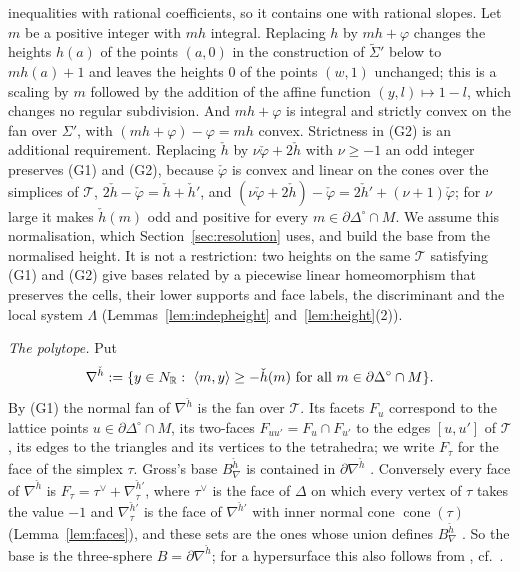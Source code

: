 inequalities with rational coefficients, so it contains one with rational slopes. Let $m$ be a positive integer with $mh$
integral. Replacing $h$
by $mh+\varphi$ changes the heights $h(a)$ of the points $(a,0)$ in the construction of $\widetilde\Sigma'$ below to
$mh(a)+1$ and leaves the heights $0$ of the points $(w,1)$ unchanged; this is a scaling by $m$ followed by the addition of the
affine function $(y,l)\mapsto1-l$, which changes no regular subdivision. And $mh+\varphi$ is integral and strictly convex on
the fan over $\Sigma'$, with $(mh+\varphi)-\varphi=mh$ convex.
Strictness in (G2) is an additional requirement. Replacing $\check h$ by $\nu\check\varphi+2\check h$ with $\nu\ge-1$ an odd
integer preserves (G1) and (G2), because $\check\varphi$ is convex and linear on the cones over the simplices of
$\mathcal T$, $2\check h-\check\varphi=\check h+\check h'$, and $(\nu\check\varphi+2\check h)-\check\varphi=2\check h'+(\nu+1)\check\varphi$; for $\nu$ large it makes
$\check h(m)$ odd and positive for every $m\in\partial\Delta^\circ\cap M$. We assume this normalisation, which
Section~\ref{sec:resolution} uses, and build the base from the normalised height. It is not a restriction: two heights on the same
$\mathcal T$ satisfying (G1) and (G2) give bases related by a piecewise linear homeomorphism that preserves the cells, their
lower supports and face labels, the discriminant and the local system $\Lambda$ (Lemmas~\ref{lem:indepheight}
and~\ref{lem:height}(2)).

\emph{The polytope.} Put
\[
\nabla^{\check h}:=\{y\in N_\mathbb R:\ \langle m,y\rangle\ge-\check h(m)\ \text{for all }m\in\partial\Delta^\circ\cap M\}.
\]
By (G1) the normal fan of $\nabla^{\check h}$ is the fan over $\mathcal T$. Its facets $F_u$ correspond to the lattice points
$u\in\partial\Delta^\circ\cap M$, its two-faces $F_{uu'}=F_u\cap F_{u'}$ to the edges $[u,u']$ of $\mathcal T$, its edges to the
triangles and its vertices to the tetrahedra; we write $F_\tau$ for the face of the simplex $\tau$. Gross's base
$B^{\check h}_\nabla$ is contained in $\partial\nabla^{\check h}$ \cite[Cor.~3.3]{Gross2005}. Conversely every face of
$\nabla^{\check h}$ is $F_\tau=\tau^\vee+\nabla^{\check h'}_\tau$, where $\tau^\vee$ is the face of $\Delta$ on which every vertex
of $\tau$ takes the value $-1$ and $\nabla^{\check h'}_\tau$ is the face of $\nabla^{\check h'}$ with inner normal cone
$\operatorname{cone}(\tau)$ (Lemma~\ref{lem:faces}), and these sets are the ones whose union defines $B^{\check h}_\nabla$
\cite[\S3]{Gross2005}. So the base is the three-sphere $B=\partial\nabla^{\check h}$; for a hypersurface this also follows
from \cite[(5.36) and Prop.~5.4]{Ya21}, cf.\ \cite[Ex.~5.16]{Ya21}.

